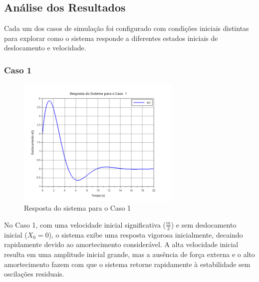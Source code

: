 \subsection{Análise dos Resultados}
Cada um dos casos de simulação foi configurado com condições iniciais distintas para explorar como o sistema responde a diferentes estados iniciais de deslocamento e velocidade.

\subsubsection{Caso 1}
\begin{figure}[H]
    \centering
    \includegraphics[width=0.7\textwidth]{1-atividade/assets/caso1.png}
    \caption{Resposta do sistema para o Caso 1}
\end{figure}
No Caso 1, com uma velocidade inicial significativa (\( \frac{m}{2} \)) e sem deslocamento inicial (\( X_0 = 0 \)), o sistema exibe uma resposta vigorosa inicialmente, decaindo rapidamente devido ao amortecimento considerável. A alta velocidade inicial resulta em uma amplitude inicial grande, mas a ausência de força externa e o alto amortecimento fazem com que o sistema retorne rapidamente à estabilidade sem oscilações residuais.

